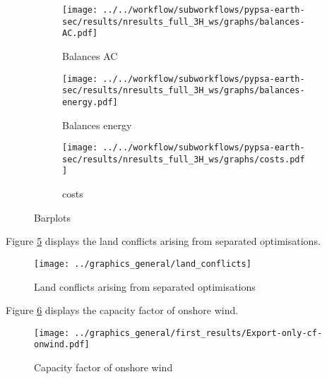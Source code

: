 \begin{figure}[h!]
    \centering
    \begin{subfigure}[b]{\linewidth}
        \centering
        \texttt{[image: ../../workflow/subworkflows/pypsa-earth-sec/results/nresults\_full\_3H\_ws/graphs/balances-AC.pdf]}
        \caption{Balances AC}
        \label{fig:balances_AC}
    \end{subfigure}
    
    \vspace{0.5cm} %
    
    \begin{subfigure}[b]{\linewidth}
        \centering
        \texttt{[image: ../../workflow/subworkflows/pypsa-earth-sec/results/nresults\_full\_3H\_ws/graphs/balances-energy.pdf]}
        \caption{Balances energy}
        \label{fig:balances_energy}
    \end{subfigure}

    \vspace{0.5cm} %
    
    \begin{subfigure}[b]{\linewidth}
        \centering
        \texttt{[image: ../../workflow/subworkflows/pypsa-earth-sec/results/nresults\_full\_3H\_ws/graphs/costs.pdf]}
        \caption{costs}
        \label{fig:balances_costs}
    \end{subfigure}
    
    \caption{Barplots}
    \label{fig:barplots}
\end{figure}



Figure \ref{fig:land_conflicts} displays the land conflicts arising from separated optimisations.

\begin{figure}[h!]
    \centering
    \texttt{[image: ../graphics\_general/land\_conflicts]}
    \caption{Land conflicts arising from separated optimisations}
    \label{fig:land_conflicts}
\end{figure}


Figure \ref{fig:cf-onwind} displays the capacity factor of onshore wind.

\begin{figure}[h!]
    \centering
    \texttt{[image: ../graphics\_general/first\_results/Export-only-cf-onwind.pdf]}
    \caption{Capacity factor of onshore wind}
    \label{fig:cf-onwind}
\end{figure}

